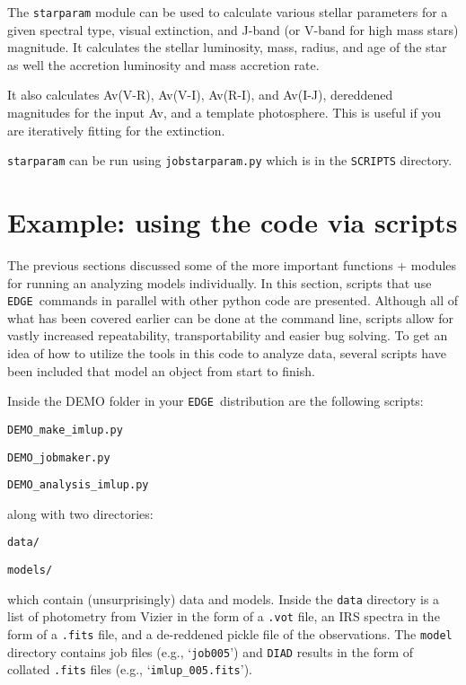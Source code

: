 \documentclass{article}
\newcommand{\edge}{\texttt{EDGE }}
\begin{document}
The \texttt{starparam} module can be used to calculate various stellar parameters for a given spectral type, visual extinction, and J-band (or V-band for high mass stars) magnitude.  It calculates the stellar luminosity, mass, radius, and age of the star as well the accretion luminosity and mass accretion rate.

It also calculates Av(V-R), Av(V-I), Av(R-I), and Av(I-J), dereddened magnitudes for the input Av, and a template photosphere. This is useful if you are iteratively fitting for the extinction. 

\texttt{starparam} can be run using \texttt{jobstarparam.py} which is in the \texttt{SCRIPTS} directory.

\section{Example: using the code via scripts} \label{scripts}

The previous sections discussed some of the more important functions + modules for running an analyzing models individually. In this section, scripts that use \edge commands in parallel with other python code are presented. Although all of what has been covered earlier can be done at the command line, scripts allow for vastly increased repeatability, transportability and easier bug solving. To get an idea of how to utilize the tools in this code to analyze data, several scripts have been included that model an object from start to finish.

Inside the DEMO folder in your \edge distribution are the following scripts:

\vspace{2mm}
\texttt{DEMO\_make\_imlup.py}

\texttt{DEMO\_jobmaker.py}

\texttt{DEMO\_analysis\_imlup.py}
\vspace{2mm}

\noindent along with two directories:

\vspace{2mm}
\texttt{data/}

\texttt{models/}
\vspace{2mm}

which contain (unsurprisingly) data and models. Inside the \texttt{data} directory is a list of photometry from Vizier in the form of a \texttt{.vot} file,  an IRS spectra in the form of a \texttt{.fits} file, and a de-reddened pickle file of the observations. The \texttt{model} directory contains job files (e.g., `\texttt{job005}') and \texttt{DIAD} results in the form of collated \texttt{.fits} files (e.g., `\texttt{imlup\_005.fits}').
\end{document}
